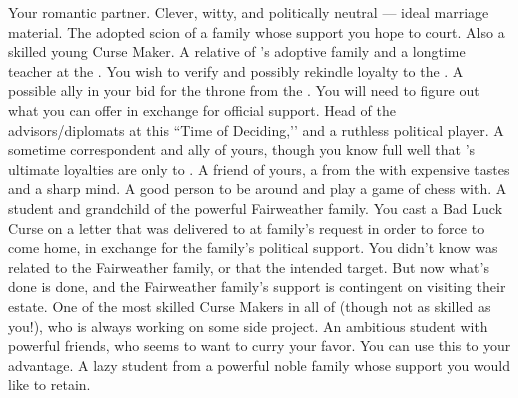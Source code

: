 \documentclass[char]{GL2020}
\begin{document}
\begin{contacts}
    \contact{\cPirate{}} Your romantic partner. Clever, witty, and politically neutral — ideal marriage material.
    \contact{\cAdopted{}} The adopted scion of a family whose support you hope to court. Also a skilled young Curse Maker. 
    \contact{\cMusic{}} A relative of \cAdopted{}'s adoptive family and a longtime teacher at the \pSchool{}. You wish to verify and possibly rekindle \cMusic{\their} loyalty to the \pFarm{}.
    \contact{\cAntiChup{}} A possible ally in your bid for the throne from the \pTech{}. You will need to figure out what you can offer \cAntiChup{\them} in exchange for official support.
    \contact{\cEvil{}} Head of the \pFarm{} advisors/diplomats at this ``Time of Deciding,’’ and a ruthless political player. A sometime correspondent and ally of yours, though you know full well that \cEvil{}'s ultimate loyalties are only to \cEvil{\themself}.
    \contact{\cHedonist{}} A friend of yours, a \cHedonist{\cleric} from the \pFarm{} with expensive tastes and a sharp mind. A good person to be around and play a game of chess with.
    \contact{\cInitiate{}} A \pShippie{} student and grandchild of the powerful Fairweather family. You cast a Bad Luck Curse on a letter that was delivered to \cInitiate{} at \cInitiate{\their} family's request in order to force \cInitiate{\them} to come home, in exchange for the family’s political support. You didn’t know \cInitiate{} was related to the Fairweather family, or that \cInitiate{\theywere} the intended target. But now what’s done is done, and the Fairweather family’s support is contingent on \cInitiate{} visiting their estate.
    \contact{\cCurse{}} One of the most skilled Curse Makers in all of \pEarth{} (though not as skilled as you!), who is always working on some side project.
    \contact{\cAmbition{}} An ambitious student with powerful friends, who seems to want to curry your favor. You can use this to your advantage. 
    \contact{\cChupStudent{}} A lazy student from a powerful noble family whose support you would like to retain. 
\end{contacts}
\end{document}
